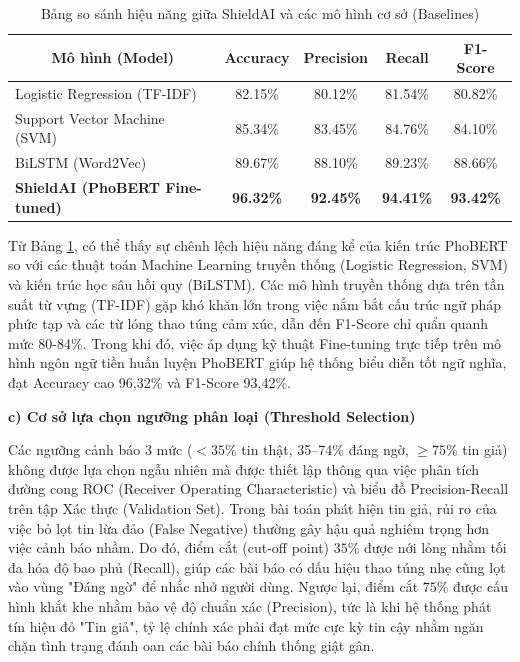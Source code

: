 \documentclass[12pt,a4paper]{article}
\begin{document}
\begin{table}[H]
\centering
\caption{Bảng so sánh hiệu năng giữa ShieldAI và các mô hình cơ sở (Baselines)}
\label{tab:hieu_nang}
\begin{tabular}{|l|c|c|c|c|}
\hline
\multicolumn{1}{|c|}{\textbf{Mô hình (Model)}} & \textbf{Accuracy} & \textbf{Precision} & \textbf{Recall} & \textbf{F1-Score} \\
\hline
Logistic Regression (TF-IDF) & 82.15\% & 80.12\% & 81.54\% & 80.82\% \\
\hline
Support Vector Machine (SVM) & 85.34\% & 83.45\% & 84.76\% & 84.10\% \\
\hline
BiLSTM (Word2Vec) & 89.67\% & 88.10\% & 89.23\% & 88.66\% \\
\hline
\textbf{ShieldAI (PhoBERT Fine-tuned)} & \textbf{96.32\%} & \textbf{92.45\%} & \textbf{94.41\%} & \textbf{93.42\%} \\
\hline
\end{tabular}
\end{table}

Từ Bảng \ref{tab:hieu_nang}, có thể thấy sự chênh lệch hiệu năng đáng kể của kiến trúc PhoBERT so với các thuật toán Machine Learning truyền thống (Logistic Regression, SVM) và kiến trúc học sâu hồi quy (BiLSTM). Các mô hình truyền thống dựa trên tần suất từ vựng (TF-IDF) gặp khó khăn lớn trong việc nắm bắt cấu trúc ngữ pháp phức tạp và các từ lóng thao túng cảm xúc, dẫn đến F1-Score chỉ quẩn quanh mức 80-84\%. Trong khi đó, việc áp dụng kỹ thuật Fine-tuning trực tiếp trên mô hình ngôn ngữ tiền huấn luyện PhoBERT giúp hệ thống biểu diễn tốt ngữ nghĩa, đạt Accuracy cao 96,32\% và F1-Score 93,42\%.

\textbf{c) Cơ sở lựa chọn ngưỡng phân loại (Threshold Selection)}

Các ngưỡng cảnh báo 3 mức ($<35\%$ tin thật, 35–74\% đáng ngờ, $\ge 75\%$ tin giả) không được lựa chọn ngẫu nhiên mà được thiết lập thông qua việc phân tích đường cong ROC (Receiver Operating Characteristic) và biểu đồ Precision-Recall trên tập Xác thực (Validation Set). Trong bài toán phát hiện tin giả, rủi ro của việc bỏ lọt tin lừa đảo (False Negative) thường gây hậu quả nghiêm trọng hơn việc cảnh báo nhầm. Do đó, điểm cắt (cut-off point) $35\%$ được nới lỏng nhằm tối đa hóa độ bao phủ (Recall), giúp các bài báo có dấu hiệu thao túng nhẹ cũng lọt vào vùng "Đáng ngờ" để nhắc nhở người dùng. Ngược lại, điểm cắt $75\%$ được cấu hình khắt khe nhằm bảo vệ độ chuẩn xác (Precision), tức là khi hệ thống phát tín hiệu đỏ "Tin giả", tỷ lệ chính xác phải đạt mức cực kỳ tin cậy nhằm ngăn chặn tình trạng đánh oan các bài báo chính thống giật gân.
\end{document}
